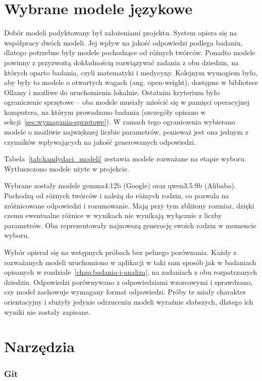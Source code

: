 \section{Wybrane modele językowe}

Dobór modeli podyktowany był założeniami projektu. System opiera się na współpracy dwóch modeli. Jej wpływ na jakość odpowiedzi podlega badaniu, dlatego potrzebne były modele pochodzące od różnych twórców. Ponadto modele powinny z przyzwoitą dokładnością rozwiązywać zadania z obu dziedzin, na których oparto badania, czyli matematyki i medycyny. Kolejnym wymogiem było, aby były to modele o otwartych wagach (ang. open-weight), dostępne w bibliotece Ollamy i możliwe do uruchomienia lokalnie. Ostatnim kryterium było ograniczenie sprzętowe -- oba modele musiały mieścić się w pamięci operacyjnej komputera, na którym prowadzono badania (szczegóły opisano w sekcji~\ref{sec:wymagania-sprzetowe}). W ramach tego ograniczenia wybierano modele o możliwie największej liczbie parametrów, ponieważ jest ona jednym z czynników wpływających na jakość generowanych odpowiedzi.

Tabela~\ref{tab:kandydaci_modeli} zestawia modele rozważane na etapie wyboru. Wytłuszczono modele użyte w projekcie.



Wybrane zostały modele gemma4:12b (Google) oraz qwen3.5:9b (Alibaba). Pochodzą od różnych twórców i należą do różnych rodzin, co pozwala na zróżnicowane odpowiedzi i rozumowanie. Mają przy tym zbliżony rozmiar, dzięki czemu ewentualne różnice w wynikach nie wynikają wyłącznie z liczby parametrów. Oba reprezentowały najnowszą generację swoich rodzin w momencie wyboru.

Wybór opierał się na wstępnych próbach bez pełnego porównania. Każdy z rozważanych modeli uruchomiono w aplikacji w taki sam sposób jak w badaniach opisanych w rozdziale~\ref{chap:badania-i-analiza}, na zadaniach z obu rozpatrzanych dziedzin. Odpowiedzi porównywano z odpowiedziami wzorcowymi i sprawdzano, czy model zachowuje wymagany format odpowiedzi. Próby te miały charakter orientacyjny i służyły jedynie odrzuceniu modeli wyraźnie słabszych, dlatego ich wyniki nie zostały zapisane.

\section{Narzędzia}

\subsubsection{Git}

